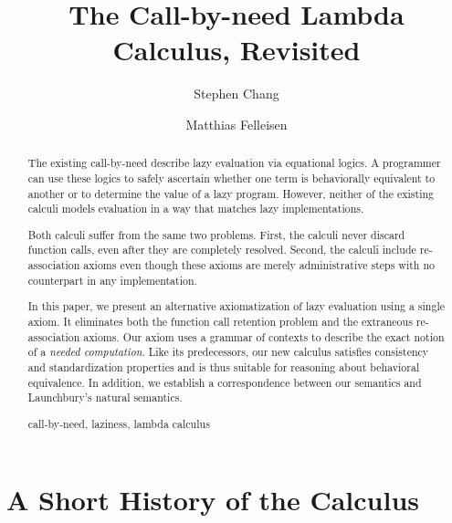 \documentclass[runningheads,a4paper]{llncs}
\newcommand{\keywords}[1]{\par\addvspace\baselineskip
\noindent\keywordname\enspace\ignorespaces#1}
\begin{document}
\mainmatter  
\title{The Call-by-need Lambda Calculus, Revisited}


\author{Stephen Chang \and Matthias Felleisen
}



\maketitle

\begin{abstract}
The existing call-by-need \lcs describe lazy evaluation via equational
 logics. A programmer can use these logics to safely ascertain whether one term
 is behaviorally equivalent to another or to determine the value of a lazy
 program. However, neither of the existing calculi models evaluation in a way
 that matches lazy implementations.
 
\hspace{10pt} Both calculi suffer from the same two problems. First, the
 calculi never discard function calls, even after they are completely
 resolved. Second, the calculi include re-association axioms even though these
 axioms are merely administrative steps with no counterpart in any
 implementation.

\hspace{10pt} In this paper, we present an alternative axiomatization of lazy
 evaluation using a single axiom. It eliminates both the function call
 retention problem and the extraneous re-association axioms. Our axiom uses a
 grammar of contexts to describe the exact notion of a \emph{needed
   computation}. Like its predecessors, our new calculus satisfies consistency
 and standardization properties and is thus suitable for reasoning about
 behavioral equivalence. In addition, we establish a correspondence between
 our semantics and Launchbury's natural semantics.

\keywords{call-by-need, laziness, lambda calculus}
\end{abstract}

\section{A Short History of the  Calculus}
\end{document}

